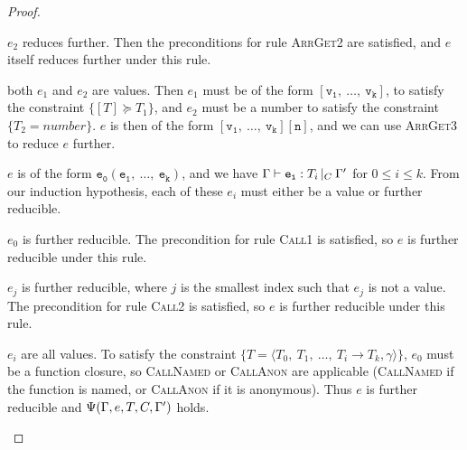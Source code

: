 \documentclass[a4paper]{article}
\theoremstyle{definition}
\theoremstyle{dotless}
\begin{document}
\begin{proof}
\begin{case}[ArrayType]
	\begin{subcase}
	  $e_2$ reduces further. 
	  Then the preconditions for rule
	  \textsc{ArrGet2} are satisfied, and $e$ itself reduces further under
	  this rule.
  	\end{subcase}

  	\begin{subcase}
	  both $e_1$ and $e_2$ are values.
	  Then $e_1$ must be of the form 
	  $\mathtt{[v_1,\ \dots,\ v_k]}$, to satisfy the constraint $\{[T] \succeq T_1\}$,
	  and $e_2$ must be a number to satisfy the constraint $\{T_2=number\}$.
	  $e$ is then of the form $\mathtt{[v_1,\ \dots,\ v_k][n]}$, and we 
	  can use \textsc{ArrGet3} to reduce $e$ further.
  	\end{subcase}

  \end{case}

  \begin{case}[CallType]\label{calltype}

  	$e$ is of the form $\mathtt{e_0(e_1,\ \dots,\ e_k)}$, and we have
  	$\Gamma{}\vdash\mathtt{e_i}: T_i\,|_C\:\Gamma'$ for $0\leq i \leq k$. From our induction hypothesis,
  	each of these $e_i$ must either be a value or further reducible.

  	\begin{subcase}
	  $e_0$ is further reducible.
	  The precondition for rule \textsc{Call1} is satisfied, so $e$ is further
	  reducible under this rule.
  	\end{subcase}

  	\begin{subcase}
	  $e_j$ is further reducible, 
	  where $j$ is the smallest index such that $e_j$ is not a value.
	  The precondition for rule \textsc{Call2} is satisfied, so $e$ is further
	  reducible under this rule.
  	\end{subcase}

	\begin{subcase}
	  $e_i$ are all values.
	  To satisfy the constraint $\{T = \langle T_0,\ T_1,\ \dots,\ T_i \rightarrow T_k, \gamma\rangle\}$,
	  $e_0$ must be a function closure, so \textsc{CallNamed} or \textsc{CallAnon} are
	  applicable (\textsc{CallNamed} if the function is named, or \textsc{CallAnon} if
	  it is anonymous). Thus $e$ is further reducible and $\Psi(\Gamma, e, T, C, \Gamma')$ holds.
	\end{subcase}

  \end{case}

  \begin{case}[PropCallType]\label{propcalltype}


\end{case}
\end{proof}
\end{document}
